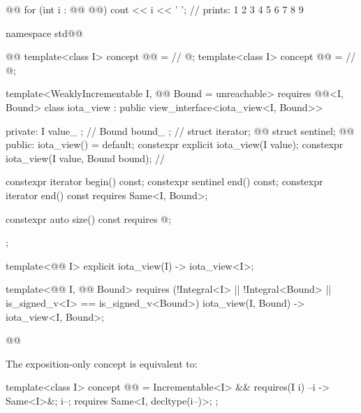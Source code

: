 \pnum
\begin{example}
\begin{codeblock}
@@
for (int i : @@ @@)
  cout << i << ' '; // prints: 1 2 3 4 5 6 7 8 9
\end{codeblock}
\end{example}

\begin{codeblock}
namespace std@@ { @@
  template<class I>
  concept @@ = // \expos
    @\seebelownc@;
  template<class I>
  concept @@ = // \expos
    @\seebelownc@;

  template<WeaklyIncrementable I, @@ Bound = unreachable>
    requires @@<I, Bound>
  class iota_view : public view_interface<iota_view<I, Bound>> {
  private:
    I value_ {}; // \expos
    Bound bound_ {}; // \expos
    struct iterator; @\newtxt{// \expos}@
    struct sentinel; @\newtxt{// \expos}@
  public:
    iota_view() = default;
    constexpr explicit iota_view(I value);
    constexpr iota_view(I value, Bound bound); // \seebelow

    constexpr iterator begin() const;
    constexpr sentinel end() const;
    constexpr iterator end() const requires Same<I, Bound>;

    constexpr auto size() const requires @\seebelownc@;
  };

  template<@@ I>
  explicit iota_view(I) -> iota_view<I>;

  template<@@ I, @@ Bound>
    requires
      (!Integral<I> || !Integral<Bound> || is_signed_v<I> == is_signed_v<Bound>)
  iota_view(I, Bound) -> iota_view<I, Bound>;
}@\oldtxt{\}}@
\end{codeblock}

\pnum
The exposition-only  concept is equivalent to:
\begin{itemdecl}
template<class I>
concept @@ =
  Incrementable<I> && requires(I i) {
    { --i } -> Same<I>&;
    i--; requires Same<I, decltype(i--)>;
  };
\end{itemdecl}

